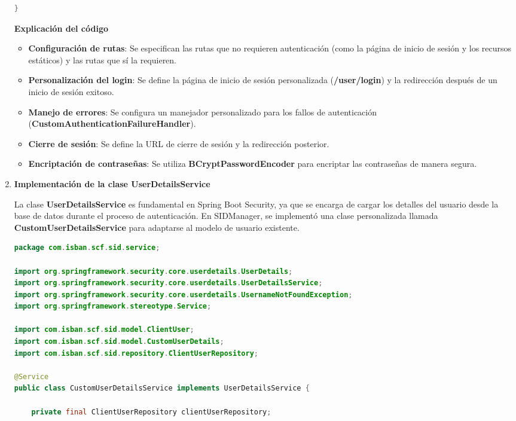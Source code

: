 \documentclass[draft]{scrbook}
\begin{document}
\begin{enumerate}
\begin{lstlisting}[language=Java]
}
\end{lstlisting}

    \textbf{Explicación del código}
    \begin{itemize}
        \item \textbf{Configuración de rutas}: Se especifican las rutas que no requieren autenticación (como la página de inicio de sesión y los recursos estáticos) y las rutas que sí la requieren.
        \item \textbf{Personalización del login}: Se define la página de inicio de sesión personalizada (\textbf{/user/login}) y la redirección después de un inicio de sesión exitoso.
        \item \textbf{Manejo de errores}: Se configura un manejador personalizado para los fallos de autenticación (\textbf{CustomAuthenticationFailureHandler}).
        \item \textbf{Cierre de sesión}: Se define la URL de cierre de sesión y la redirección posterior.
        \item \textbf{Encriptación de contraseñas}: Se utiliza \textbf{BCryptPasswordEncoder} para encriptar las contraseñas de manera segura.
    \end{itemize}

    \item \textbf{Implementación de la clase UserDetailsService}
    
    La clase \textbf{UserDetailsService} es fundamental en Spring Boot Security, ya que se encarga de cargar los detalles del usuario desde la base de datos durante el proceso de autenticación. En SIDManager, se implementó una clase personalizada llamada \textbf{CustomUserDetailsService} para adaptarse al modelo de usuario existente.

\begin{lstlisting}[language=Java]
package com.isban.scf.sid.service;

import org.springframework.security.core.userdetails.UserDetails;
import org.springframework.security.core.userdetails.UserDetailsService;
import org.springframework.security.core.userdetails.UsernameNotFoundException;
import org.springframework.stereotype.Service;

import com.isban.scf.sid.model.ClientUser;
import com.isban.scf.sid.model.CustomUserDetails;
import com.isban.scf.sid.repository.ClientUserRepository;

@Service
public class CustomUserDetailsService implements UserDetailsService {

	private final ClientUserRepository clientUserRepository;
	

\end{lstlisting}
\end{enumerate}
\end{document}
